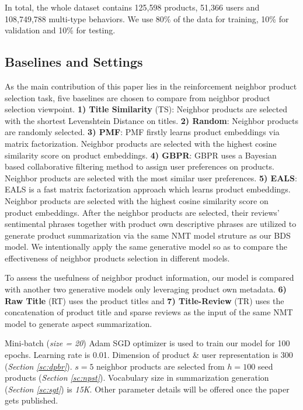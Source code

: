 In total, the whole dataset contains 125,598 products, 51,366 users and 108,749,788 multi-type behaviors. We use 80\% of the data for training, 10\% for validation and 10\% for testing.  


\subsection{Baselines and Settings} \label{sc:baseline}

As the main contribution of this paper lies in the reinforcement neighbor product selection task, five baselines are chosen to compare from neighbor product selection viewpoint. \textbf{1) Title Similarity} (TS): Neighbor products are selected with the shortest Levenshtein Distance on titles. \textbf{2) Random}: Neighbor products are randomly selected. \textbf{3) PMF}: PMF \cite{mnih2008probabilistic}  firstly learns product embeddings via matrix factorization. Neighbor products are selected with the highest cosine similarity score on product embeddings. \textbf{4) GBPR}: GBPR \cite{pan2013gbpr} uses a Bayesian based collaborative filtering method to assign user preferences on products. Neighbor products are selected with the most similar user preferences. \textbf{5) EALS}: EALS \cite{he2016fast} is a fast matrix factorization approach which learns product embeddings. Neighbor products are selected with the highest cosine similarity score on product embeddings. After the neighbor products are selected, their reviews' sentimental phrases together with product own descriptive phrases are utilized to generate product summarization via the same NMT model struture  as our BDS model. We intentionally apply the same generative model so as to compare the effectiveness of neighbor products selection in different models.

To assess the usefulness of neighbor product information, our model is compared with another two generative models only leveraging product own  metadata. \textbf{6) Raw Title} (RT) uses the product titles and  \textbf{7) Title-Review} (TR) uses the concatenation of product title and sparse reviews as the input of the same NMT model to generate aspect summarization.
 

Mini-batch (\textit{size = 20}) Adam SGD optimizer is used to train our model for 100 epochs. Learning rate is 0.01. Dimension of product \& user representation is 300 (\textit{Section \ref{sc:dpbr}}). $s=5$ neighbor products are selected from $h=100$ seed products (\textit{Section \ref{sc:npst}}). Vocabulary size in summarization generation (\textit{Section \ref{sc:sgt}}) is \textit{15K}. Other parameter details will be offered once the paper gets published.


